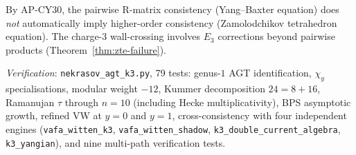 \begin{remark}
\label{rem:k3e-agt-higher-coherence}
By AP-CY30, the pairwise R-matrix consistency (Yang--Baxter equation) does \emph{not} automatically imply higher-order consistency (Zamolodchikov tetrahedron equation). The charge-$3$ wall-crossing involves $E_3$ corrections beyond pairwise products (Theorem~\ref{thm:zte-failure}).
\end{remark}

\noindent\textit{Verification}: \texttt{nekrasov\_agt\_k3.py}, 79 tests: genus-$1$ AGT identification, $\chi_y$ specialisations, modular weight $-12$, Kummer decomposition $24 = 8 + 16$, Ramanujan $\tau$ through $n = 10$ (including Hecke multiplicativity), BPS asymptotic growth, refined VW at $y = 0$ and $y = 1$, cross-consistency with four independent engines (\texttt{vafa\_witten\_k3}, \texttt{vafa\_witten\_shadow}, \texttt{k3\_double\_current\_algebra}, \texttt{k3\_yangian}), and nine multi-path verification tests.

